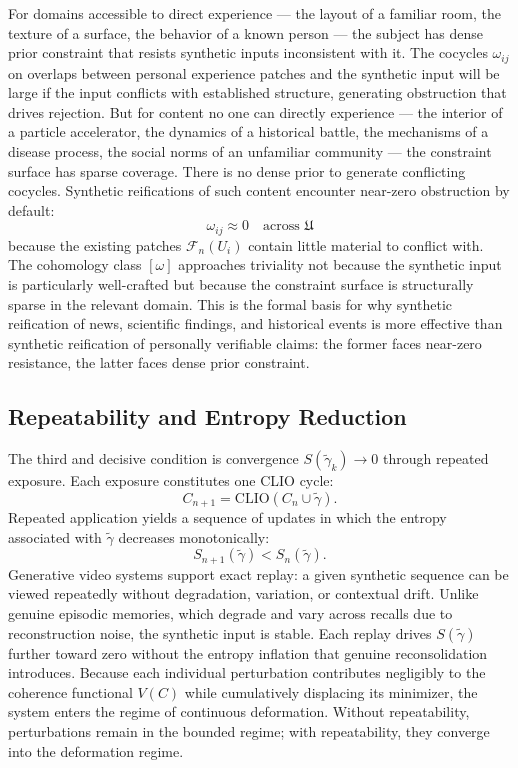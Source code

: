 \documentclass[12pt, a4paper]{article}
\begin{document}
For domains accessible to direct experience — the layout of a familiar room, the texture of a surface, the behavior of a known person — the subject has dense prior constraint that resists synthetic inputs inconsistent with it. The cocycles $\omega_{ij}$ on overlaps between personal experience patches and the synthetic input will be large if the input conflicts with established structure, generating obstruction that drives rejection. But for content no one can directly experience — the interior of a particle accelerator, the dynamics of a historical battle, the mechanisms of a disease process, the social norms of an unfamiliar community — the constraint surface has sparse coverage. There is no dense prior to generate conflicting cocycles. Synthetic reifications of such content encounter near-zero obstruction by default:
\[
\omega_{ij} \approx 0 \quad \text{across } \mathfrak{U}
\]
because the existing patches $\mathcal{F}_n(U_i)$ contain little material to conflict with. The cohomology class $[\omega]$ approaches triviality not because the synthetic input is particularly well-crafted but because the constraint surface is structurally sparse in the relevant domain. This is the formal basis for why synthetic reification of news, scientific findings, and historical events is more effective than synthetic reification of personally verifiable claims: the former faces near-zero resistance, the latter faces dense prior constraint.

\subsection{Repeatability and Entropy Reduction}

The third and decisive condition is convergence $S(\tilde{\gamma}_k) \to 0$ through repeated exposure. Each exposure constitutes one CLIO cycle:
\[
C_{n+1} = \mathrm{CLIO}(C_n \cup \tilde{\gamma}).
\]
Repeated application yields a sequence of updates in which the entropy associated with $\tilde{\gamma}$ decreases monotonically:
\[
S_{n+1}(\tilde{\gamma}) < S_n(\tilde{\gamma}).
\]
Generative video systems support exact replay: a given synthetic sequence can be viewed repeatedly without degradation, variation, or contextual drift. Unlike genuine episodic memories, which degrade and vary across recalls due to reconstruction noise, the synthetic input is stable. Each replay drives $S(\tilde{\gamma})$ further toward zero without the entropy inflation that genuine reconsolidation introduces. Because each individual perturbation contributes negligibly to the coherence functional $V(C)$ while cumulatively displacing its minimizer, the system enters the regime of continuous deformation. Without repeatability, perturbations remain in the bounded regime; with repeatability, they converge into the deformation regime.
\end{document}
